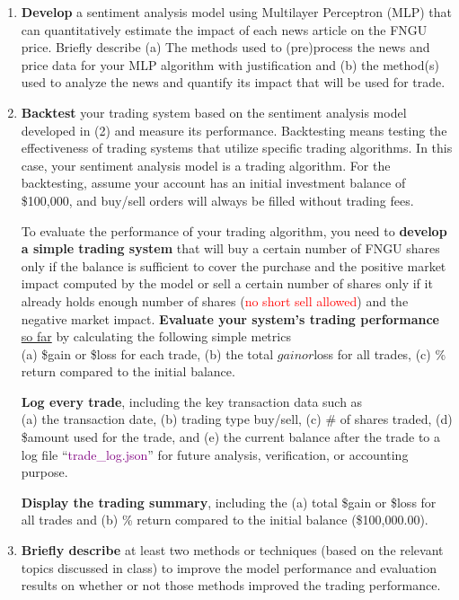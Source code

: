 \documentclass[twocolumn,10pt]{article}
\begin{document}
\begin{multicols}{2}
\begin{flushleft}
\begin{enumerate}
	\item \textbf{Develop} a sentiment analysis model using Multilayer Perceptron (MLP) that can quantitatively estimate the impact of each news article on the FNGU price. Briefly describe 
		\subitem (a) The methods used to (pre)process the news and price data for your MLP algorithm with justification and 
		\subitem (b) the method(s) used to analyze the news and quantify its impact that will be used for trade.
	
	\item \textbf{Backtest} your trading system based on the sentiment analysis model developed in (2) and measure its performance. Backtesting means testing the effectiveness of trading systems that utilize specific trading algorithms. In this case, your sentiment analysis model is a trading algorithm. For the backtesting, assume your account has an initial investment balance of \$100,000, and buy/sell orders will always be filled without trading fees. 

	To evaluate the performance of your trading algorithm, you need to \textbf{develop a simple trading system} that will buy a certain number of FNGU shares only if the balance is sufficient to cover the purchase and the positive market impact computed by the model or sell a certain number of shares only if it already holds enough number of shares (\textcolor{red}{no short sell allowed}) and the negative market impact. 
	\textbf{Evaluate your system’s trading performance} \underline{so far} by calculating the following simple metrics\\
		\subitem (a) \$gain or \$loss for each trade, 
		\subitem (b) the total $gain or $loss for all trades, 
		\subitem (c) \% return compared to the initial balance. 
		
	\textbf{Log every trade}, including the key transaction data such as\\
		\subitem (a) the transaction date, 
		\subitem (b) trading type buy/sell, 
		\subitem (c) \# of shares traded, 
		\subitem (d) \$amount used for the trade, and 
		\subitem (e) the current balance after the trade to a log file \enquote{\textcolor{purple}{trade\_log.json}} for future analysis, verification, or accounting purpose.
		
	\textbf{Display the trading summary}, including the 
		\subitem (a) total \$gain or \$loss for all trades and
		\subitem (b) \% return compared to the initial balance (\$100,000.00).

	\item \textbf{Briefly describe} at least two methods or techniques (based on the relevant topics discussed in class) to improve the model performance and evaluation results on whether or not those methods improved the trading performance.
	

\end{enumerate}
\end{flushleft}
\end{multicols}
\end{document}
